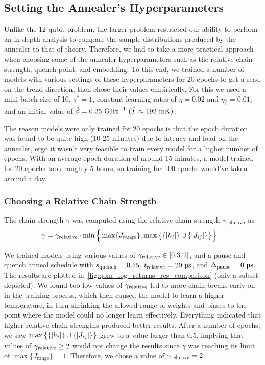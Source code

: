 \subsection{Setting the Annealer's Hyperparameters}\label{sec:qbm_hyperparameters}
Unlike the 12-qubit problem, the larger problem restricted our ability to perform an in-depth analysis to compare the sample distributions produced by the annealer to that of theory.
Therefore, we had to take a more practical approach when choosing some of the annealer hyperparameters such as the relative chain strength, quench point, and embedding.
To this end, we trained a number of models with various settings of these hyperparameters for 20 epochs to get a read on the trend direction, then chose their values empirically.
For this we used a mini-batch size of 10, \( s^* = 1 \), constant learning rates of \( \eta = 0.02 \) and \( \eta_{\hat{\beta}} = 0.01 \), and an initial value of \( \betahat = 0.25 \ \si{\giga\hertz}^{-1} \ (\hat{T} \approx 192 \ \si{\milli\kelvin}) \).

The reason models were only trained for 20 epochs is that the epoch duration was found to be quite high (10-25 minutes) due to latency and load on the annealer, ergo it wasn't very feasible to train every model for a higher number of epochs.
With an average epoch duration of around 15 minutes, a model trained for 20 epochs took roughly 5 hours, so training for 100 epochs would've taken around a day.

\subsubsection{Choosing a Relative Chain Strength}\label{sec:qbm_rcs}
The chain strength \( \gamma \) was computed using the relative chain strength \( \gamma_{\text{relative}} \) as
\begin{align}
    \gamma
        &= \gamma_{\text{relative}} \cdot \min\Big\{
            \max\{J_\text{range}\}, \max\big\{\{\lvert h_i\rvert\} \cup \{\lvert J_{ij}\rvert\}\big\}
        \Big\}
\end{align}

We trained models using various values of \( \gamma_{\text{relative}} \in [0.3, 2] \), and a pause-and-quench anneal schedule with \( s_{\text{quench}} = 0.55 \), \( t_{\text{relative}} = 20 \ \si{\micro\second} \), and \( \Deltapause = 0 \ \si{\micro\second} \).
The results are plotted in~\cref{fig:qbm_log_returns_rcs_comparison} (only a subset depicted).
We found too low values of \( \gamma_{\text{relative}} \) led to more chain breaks early on in the training process, which then caused the model to learn a higher temperature, in turn shrinking the allowed range of weights and biases to the point where the model could no longer learn effectively.
Everything indicated that higher relative chain strengths produced better results.
After a number of epochs, we saw \( \max\big\{ \{\lvert h_i\rvert\} \cup \{\lvert J_{ij}\rvert\} \big\} \) grew to a value larger than 0.5, implying that values of \( \gamma_{\text{relative}} \ge 2 \) would not change the results since \( \gamma \) was reaching its limit of \( \max\{J_\text{range}\} = 1 \).
Therefore, we chose a value of \( \gamma_{\text{relative}} = 2 \).

